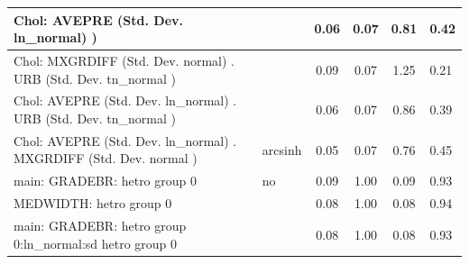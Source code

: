 \begin{table}
\begin{center}
\begin{tabular}{|l|l|c|c|c|l|}
			\hline
			 Chol: AVEPRE (Std. Dev. ln_normal) ) &  & 0.06 & 0.07 & 0.81 & 0.42 \\
			\hline
			 Chol: MXGRDIFF (Std. Dev. normal) . URB (Std. Dev.   tn_normal ) &  & 0.09 & 0.07 & 1.25 & 0.21 \\
			\hline
			 Chol: AVEPRE (Std. Dev. ln_normal) . URB (Std. Dev.   tn_normal ) &  & 0.06 & 0.07 & 0.86 & 0.39 \\
			\hline
			 Chol: AVEPRE (Std. Dev. ln_normal) . MXGRDIFF (Std. Dev.   normal ) & arcsinh & 0.05 & 0.07 & 0.76 & 0.45 \\
			\hline
			main: GRADEBR: hetro group 0 & no & 0.09 & 1.00 & 0.09 & 0.93 \\
			\hline
			MEDWIDTH: hetro group 0 &  & 0.08 & 1.00 & 0.08 & 0.94 \\
			\hline
			main: GRADEBR: hetro group 0:ln_normal:sd  hetro group 0 &  & 0.08 & 1.00 & 0.08 & 0.93 \\
			\hline
		\end{tabular}
	\end{center}
\end{table}